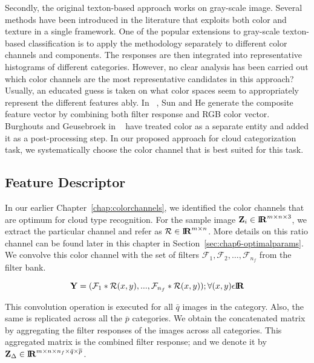Secondly, the original texton-based approach works on gray-scale image. Several methods have been introduced in the literature that exploits both color and texture in a single framework. One of the popular extensions to gray-scale texton-based classification is to apply the methodology separately to different color channels and components. The responses are then integrated into representative histograms of different categories. However, no clear analysis has been carried out which color channels are the most representative candidates in this approach? Usually, an educated guess is taken on what color spaces seem to appropriately represent the different features ably. In ~\cite{Sun2009}, Sun and He generate the composite feature vector by combining both filter response and RGB color vector. Burghouts and Geusebroek in ~\cite{bur2006} have treated color as a separate entity and added it as a post-processing step. In our proposed approach for cloud categorization task, we systematically choose the color channel that is best suited for this task.

\subsection{Feature Descriptor}

In our earlier Chapter~\ref{chap:colorchannels}, we identified the color channels that are optimum for cloud type recognition. 
For the sample image $\mathbf{Z}_i \in {\rm I\!\mathbf{R}}^{m \times n \times 3}$, we extract the particular channel and refer as $\mathcal{R} \in {\rm I\!\mathbf{R}}^{m \times n}$. More details on this ratio channel can be found later in this chapter in Section~\ref{sec:chap6-optimalparams}. We convolve this color channel with the set of filters $\mathcal{F}_1, \mathcal{F}_2,\ldots,\mathcal{F}_{n_f}$ from the filter bank.

\begin{equation*}
\label{eq:conv}
\mathbf{Y}=(\mathcal{F}_1 * \mathcal{R}(x,y),...,\mathcal{F}_{n_f} * \mathcal{R}(x,y)); \forall (x,y) \epsilon {\rm I\!\mathbf{R}} 
\end{equation*} 

This convolution operation is executed for all $\bar{q}$ images in the category. Also, the same is replicated across all the $\overline{p}$ categories. We obtain the concatenated matrix by aggregating the filter responses of the images across all categories. This aggregated matrix is the combined filter response; and we denote it by $\mathbf{Z}_{\Delta} \in {\rm I\!\mathbf{R}}^{m \times n \times {n_f} \times \bar{q} \times \overline{p}}$.

